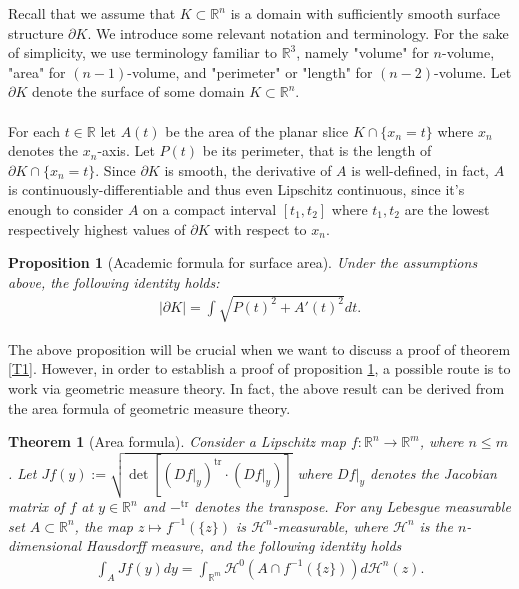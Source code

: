 \documentclass[12pt, a4paper, titlepage]{article}
\newtheorem{proposition}{Proposition}
\newtheorem{thm}{Theorem}
\begin{document}
Recall that we assume that  $K \subset \mathbb{R}^n$ is a domain with sufficiently smooth surface structure $\partial K$. We introduce some relevant notation and terminology. For the sake of simplicity, we use terminology familiar to $\mathbb{R}^3$, namely "volume" for $n$-volume, "area" for $(n-1)$-volume, and "perimeter" or "length" for $(n-2)$-volume. Let $\partial K$ denote the surface of some domain $K \subset \mathbb{R}^n$.
\\\\
For each $t \in \mathbb{R}$ let $A(t)$ be the area of the planar slice $K \cap \{x_n = t\}$ where $x_n$ denotes the $x_n$-axis. Let $P(t)$ be its perimeter, that is the length of $\partial K \cap \{x_n=t\}$. Since $\partial K$ is smooth, the derivative of $A$ is well-defined, in fact, $A$ is continuously-differentiable and thus even Lipschitz continuous, since it's enough to consider $A$ on a compact interval $[t_1,t_2]$ where $t_1,t_2$ are the lowest respectively highest values of $\partial K$ with respect to $x_n$. 
\begin{proposition}[Academic formula for surface area] \label{P1} Under the assumptions above, the following identity holds:
\begin{align*}
| \partial K| = \int \sqrt{P(t)^2 + A'(t)^2}dt.
\end{align*}
\end{proposition}
\noindent The above proposition will be crucial when we want to discuss a proof of theorem \ref{T1}. However, in order to establish a proof of proposition \ref{P1}, a possible route is to work via geometric measure theory. In fact, the above result can be derived from the area formula of geometric measure theory. 
\begin{thm}[Area formula] Consider a Lipschitz map $f: \mathbb{R}^n \to \mathbb{R}^m$, where $n \leq m$. Let $Jf(y):= \sqrt{ \det[(Df|_y)^\text{tr} \cdot (Df|_y)]}$ where $Df|_y$ denotes the Jacobian matrix of $f$ at $y \in \mathbb{R}^n$ and $-^\text{tr}$ denotes the transpose. For any Lebesgue measurable set $A \subset \mathbb{R}^n$, the map $z \mapsto f^{-1}( \{z\})$ is $\mathcal{H}^n$-measurable, where $\mathcal{H}^n$ is the $n$-dimensional Hausdorff measure, and the following identity holds
\begin{align*}
\int_A Jf(y)dy = \int_{\mathbb{R}^m} \mathcal{H}^0( A \cap f^{-1}( \{z\}))d \mathcal{H}^n (z).
\end{align*}
\end{thm}
\end{document}
